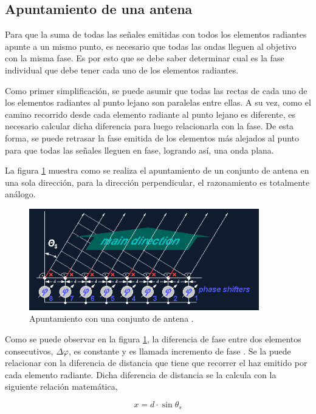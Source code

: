 \subsection{Apuntamiento de una antena}\label{ssec:beamSteering}

Para que la suma de todas las señales emitidas con todos los elementos radiantes apunte a un mismo punto, es necesario que
todas las ondas lleguen al objetivo con la misma fase. Es por esto que se debe saber determinar cual es la fase individual que
debe tener cada uno de los elementos radiantes.

Como primer simplificación, se puede asumir que todas las rectas de cada uno de los elementos radiantes al punto lejano son
paralelas entre ellas. A su vez, como el camino recorrido desde cada elemento radiante al punto lejano es diferente, es
necesario calcular dicha diferencia para luego relacionarla con la fase. De esta forma, se puede retrasar la fase emitida de
los elementos más alejados al punto para que todas las señales lleguen en fase, logrando así, una onda plana.

La figura \ref{fig:beamSteering} muestra como se realiza el apuntamiento de un conjunto de antena en una sola dirección,
para la dirección perpendicular, el razonamiento es totalmente análogo.

\begin{figure}[H]
 \centering
 \includegraphics[width=10cm]{gfx/beamSteering.png}
 \caption{Apuntamiento con una conjunto de antena \cite{BeamSteering}.}
 \label{fig:beamSteering}
\end{figure}

Como se puede observar en la figura \ref{fig:beamSteering}, la diferencia de fase entre dos elementos consecutivos,
$\Delta\varphi$, es constante y es llamada incremento de fase \cite{BeamSteering}. Se la puede relacionar con la diferencia
de distancia que tiene que recorrer el haz emitido por cada elemento radiante. Dicha diferencia de distancia se la calcula con
la siguiente relación matemática,


\begin{equation}
	x = d\cdot \sin{\theta_s}
	\label{eq:steering}
\end{equation}

